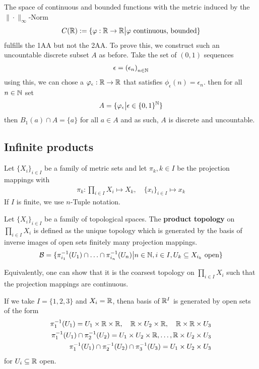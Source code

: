 \begin{ex}[]
  The space of continuous and bounded functions with the metric induced by the $\|\cdot\|_{\infty}$-Norm
  \begin{align*}
    C(\mathbb{R}) := \{\varphi:  \mathbb{R} \to \mathbb{R} \big\vert \varphi \text{ continuous, bounded}\}
  \end{align*}
  fulfills the 1AA but not the 2AA.
  To prove this, we construct such an uncountable discrete subset $A$ as before. Take the set of $(0,1)$ sequences
  \begin{align*}
    \epsilon = \left(\epsilon_{n}\right)_{n \in \mathbb{N}}
  \end{align*}
  using this, we can chose a $\varphi_{\epsilon}: \mathbb{R} \to \mathbb{R}$ that satisfies $\phi_{\epsilon}(n) = \epsilon_n$.
  then for all $n \in \mathbb{N}$ set
  \begin{align*}
    A = \{\varphi_{\epsilon} \big\vert \epsilon \in \{0,1\}^{\mathbb{N}}\}
  \end{align*}
  then $B_1(a) \cap A = \{a\}$ for all $a \in A$ and as such, $A$ is discrete and uncountable.
\end{ex}



\subsection{Infinite products}
Let $\{X_i\}_{i \in I}$ be a family of metric sets and let $\pi_k, k \in I$ be the projection mappings with
\begin{align*}
  \pi_k: \prod_{i \in I}X_i \mapsto  X_k, \quad \{x_i\}_{i \in I} \mapsto  x_k
\end{align*}
If $I$ is finite, we use $n$-Tuple notation.


\begin{dfn}[]
Let $\{X_i\}_{i \in I}$ be a family of topological spaces.
The \textbf{product topology} on $\prod_{i \in I}X_i$ is defined as the unique topology which is generated by the basis of inverse images of open sets finitely many projection mappings.
  \begin{align*}
    \mathcal{B} = \{\pi_{i_1}^{-1}(U_1) \cap \ldots \cap \pi_{i_n}^{-1}(U_n) \big\vert n \in \mathbb{N}, i \in I, U_k \subseteq X_{i_k} \text{ open}\}
  \end{align*}
\end{dfn}
Equivalently, one can show that it is the coarsest topology on $\prod_{i \in I} X_i$ such that the projection mappings are continuous.

\begin{ex}[]
If we take $I = \{1,2,3\}$ and $X_i = \mathbb{R}$, thena basis of $\mathbb{R}^{I}$ is generated by open sets of the form
\begin{align*}
  \pi_1^{-1}(U_1) = U_1 \times \mathbb{R} \times \mathbb{R}, \quad
  \mathbb{R} \times U_2 \times \mathbb{R}, 
  \quad
  \mathbb{R} \times \mathbb{R} \times U_3\\
  \pi_1^{-1}(U_1) \cap \pi_2^{-1}(U_2) = U_1 \times U_2 \times \mathbb{R}, \ldots, \mathbb{R} \times U_2 \times U_3\\
  \pi_1^{-1}(U_1) \cap \pi_2^{-1}(U_2) \cap \pi_3^{-1}(U_3) = U_1 \times U_2 \times U_3
\end{align*}
for $U_i \subseteq \mathbb{R}$ open.
\end{ex}

